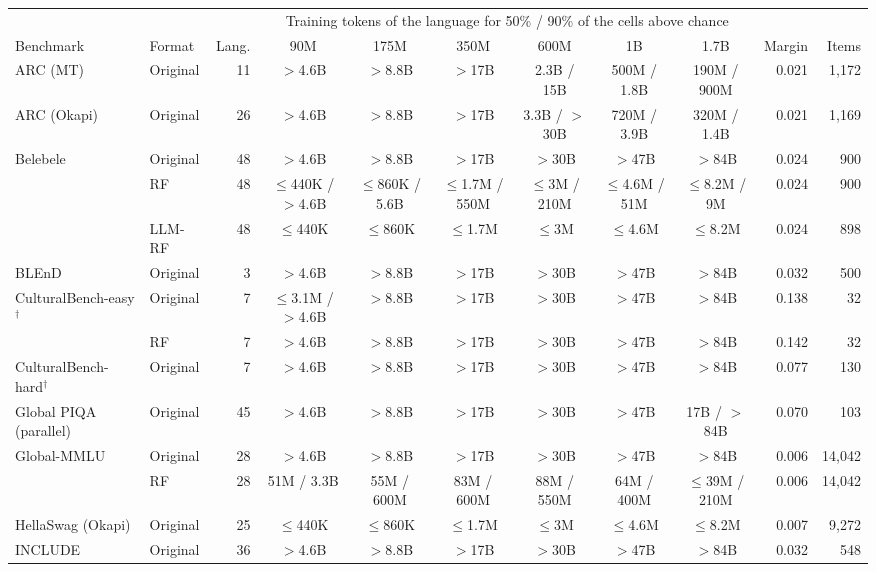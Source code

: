 \begin{tabular}{llrccccccrr}
\toprule
 & & & \multicolumn{6}{c}{Training tokens of the language for 50\% / 90\% of the cells above chance} & & \\
\cmidrule(lr){4-9}
Benchmark & Format & Lang. & 90M & 175M & 350M & 600M & 1B & 1.7B & Margin & Items \\
\midrule
ARC (MT) & Original & 11 & $>$4.6B & $>$8.8B & $>$17B & 2.3B / 15B & 500M / 1.8B & 190M / 900M & 0.021 & 1{,}172 \\
\addlinespace
ARC (Okapi) & Original & 26 & $>$4.6B & $>$8.8B & $>$17B & 3.3B / $>$30B & 720M / 3.9B & 320M / 1.4B & 0.021 & 1{,}169 \\
\addlinespace
Belebele & Original & 48 & $>$4.6B & $>$8.8B & $>$17B & $>$30B & $>$47B & $>$84B & 0.024 & 900 \\
 & RF & 48 & $\leq$440K / $>$4.6B & $\leq$860K / 5.6B & $\leq$1.7M / 550M & $\leq$3M / 210M & $\leq$4.6M / 51M & $\leq$8.2M / 9M & 0.024 & 900 \\
 & LLM-RF & 48 & $\leq$440K & $\leq$860K & $\leq$1.7M & $\leq$3M & $\leq$4.6M & $\leq$8.2M & 0.024 & 898 \\
\addlinespace
BLEnD & Original & 3 & $>$4.6B & $>$8.8B & $>$17B & $>$30B & $>$47B & $>$84B & 0.032 & 500 \\
\addlinespace
CulturalBench-easy$^\dagger$ & Original & 7 & $\leq$3.1M / $>$4.6B & $>$8.8B & $>$17B & $>$30B & $>$47B & $>$84B & 0.138 & 32 \\
 & RF & 7 & $>$4.6B & $>$8.8B & $>$17B & $>$30B & $>$47B & $>$84B & 0.142 & 32 \\
\addlinespace
CulturalBench-hard$^\dagger$ & Original & 7 & $>$4.6B & $>$8.8B & $>$17B & $>$30B & $>$47B & $>$84B & 0.077 & 130 \\
\addlinespace
Global PIQA (parallel) & Original & 45 & $>$4.6B & $>$8.8B & $>$17B & $>$30B & $>$47B & 17B / $>$84B & 0.070 & 103 \\
\addlinespace
Global-MMLU & Original & 28 & $>$4.6B & $>$8.8B & $>$17B & $>$30B & $>$47B & $>$84B & 0.006 & 14{,}042 \\
 & RF & 28 & 51M / 3.3B & 55M / 600M & 83M / 600M & 88M / 550M & 64M / 400M & $\leq$39M / 210M & 0.006 & 14{,}042 \\
\addlinespace
HellaSwag (Okapi) & Original & 25 & $\leq$440K & $\leq$860K & $\leq$1.7M & $\leq$3M & $\leq$4.6M & $\leq$8.2M & 0.007 & 9{,}272 \\
\addlinespace
INCLUDE & Original & 36 & $>$4.6B & $>$8.8B & $>$17B & $>$30B & $>$47B & $>$84B & 0.032 & 548 \\

\end{tabular}
